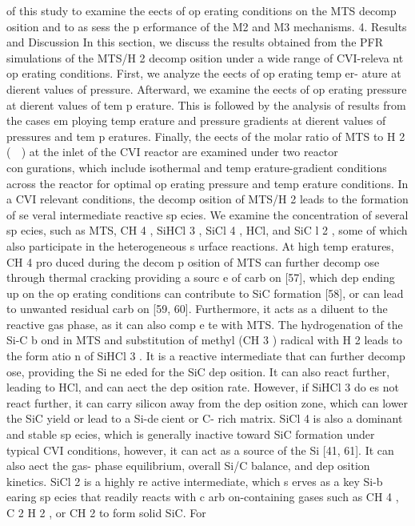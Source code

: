 \documentclass[10pt, letterpaper]{article}
\begin{document}
of this study to examine the eects of op erating conditions on the MTS decomp osition and to as sess the
p erformance of the M2 and M3 mechanisms.
4. Results and Discussion
In this section, we discuss the results obtained from the PFR simulations of the MTS/H
2
decomp osition
under a wide range of CVI-releva nt op erating conditions. First, we analyze the eects of op erating temp er-
ature at dierent values of pressure. Afterward, we examine the eects of op erating pressure at dierent
values of tem p erature. This is followed by the analysis of results from the cases em ploying temp erature and
pressure gradients at dierent values of pressures and tem p eratures. Finally, the eects of the molar ratio
of MTS to H
2
(

) at the inlet of the CVI reactor are examined under two reactor congurations, which
include isothermal and temp erature-gradient conditions across the reactor for optimal op erating pressure
and temp erature conditions.
In a CVI relevant conditions, the decomp osition of MTS/H
2
leads to the formation of se veral intermediate
reactive sp ecies. We examine the concentration of several sp ecies, such as MTS, CH
4
, SiHCl
3
, SiCl
4
, HCl,
and SiC l
2
, some of which also participate in the heterogeneous s urface reactions. At high temp eratures,
CH
4
pro duced during the decom p osition of MTS can further decomp ose through thermal cracking providing
a sourc e of carb on [57], which dep ending up on the op erating conditions can contribute to SiC formation
[58], or can lead to unwanted residual carb on [59, 60]. Furthermore, it acts as a diluent to the reactive gas
phase, as it can also comp e te with MTS. The hydrogenation of the Si-C b ond in MTS and substitution of
methyl (CH
3
) radical with H
2
leads to the form atio n of SiHCl
3
. It is a reactive intermediate that can further
decomp ose, providing the Si ne eded for the SiC dep osition. It can also react further, leading to HCl, and
can aect the dep osition rate. However, if SiHCl
3
do es not react further, it can carry silicon away from the
dep osition zone, which can lower the SiC yield or lead to a Si-decient or C- rich matrix. SiCl
4
is also a
dominant and stable sp ecies, which is generally inactive toward SiC formation under typical CVI conditions,
however, it can act as a source of the Si [41, 61]. It can also aect the gas- phase equilibrium, overall Si/C
balance, and dep osition kinetics. SiCl
2
is a highly re active intermediate, which s erves as a key Si-b earing
sp ecies that readily reacts with c arb on-containing gases such as CH
4
, C
2
H
2
, or CH
2
to form solid SiC. For
\end{document}
